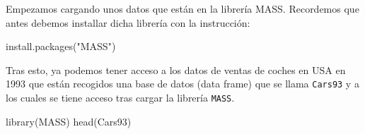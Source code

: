 \documentclass[
]{book}
\newenvironment{Shaded}{\begin{snugshade}}{\end{snugshade}}
\newcommand{\FunctionTok}[1]{\textcolor[rgb]{0.00,0.00,0.00}{#1}}
\newcommand{\NormalTok}[1]{#1}
\newcommand{\StringTok}[1]{\textcolor[rgb]{0.31,0.60,0.02}{#1}}
\begin{document}
Empezamos cargando unos datos que están en la librería MASS. Recordemos que antes debemos installar dicha librería con la instrucción:

\begin{Shaded}
\begin{Highlighting}[]
\FunctionTok{install.packages}\NormalTok{(}\StringTok{"MASS"}\NormalTok{)}
\end{Highlighting}
\end{Shaded}

Tras esto, ya podemos tener acceso a los datos de ventas de coches en USA en 1993 que están recogidos una base de datos (data frame) que se llama \texttt{Cars93} y a los cuales se tiene acceso tras cargar la librería \texttt{MASS}.

\begin{Shaded}
\begin{Highlighting}[]
\FunctionTok{library}\NormalTok{(MASS)}
\FunctionTok{head}\NormalTok{(Cars93)}
\end{Highlighting}
\end{Shaded}
\end{document}

